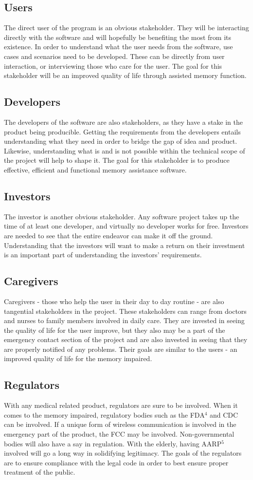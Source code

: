 \documentclass[12pt]{article}
\theoremstyle{plain}
\theoremstyle{definition}
\begin{document}
\subsection*{Users}
The direct user of the program is an obvious stakeholder.  They will be interacting directly with the software and will hopefully be benefiting the most from its existence. In order to understand what the user needs from the software, use cases and scenarios need to be developed.  These can be directly from user interaction, or interviewing those who care for the user. The goal for this stakeholder will be an improved quality of life through assisted memory function.
\subsection*{Developers}
The developers of the software are also stakeholders, as they have a stake in the product being producible. Getting the requirements from the developers entails understanding what they need in order to bridge the gap of idea and product.  Likewise, understanding what is and is not possible within the technical scope of the project will help to shape it.  The goal for this stakeholder is to produce effective, efficient and functional memory assistance software.
\subsection*{Investors}
The investor is another obvious stakeholder. Any software project takes up the time of at least one developer, and virtually no developer works for free. Investors are needed to see that the entire endeavor can make it off the ground.  Understanding that the investors will want to make a return on their investment is an important part of understanding the investors' requirements.
\subsection*{Caregivers}
Caregivers - those who help the user in their day to day routine - are also tangential stakeholders in the project.  These stakeholders can range from doctors and nurses to family members involved in daily care. They are invested in seeing the quality of life for the user improve, but they also may be a part of the emergency contact section of the project and are also invested in seeing that they are properly notified of any problems.  Their goals are similar to the users - an improved quality of life for the memory impaired.
\subsection*{Regulators}
With any medical related product, regulators are sure to be involved.  When it comes to the memory impaired, regulatory bodies such as the FDA${^4}$ and CDC can be involved.  If a unique form of wireless communication is involved in the emergency part of the product, the FCC may be involved.  Non-governmental bodies will also have a say in regulation.  With the elderly, having AARP${^5}$ involved will go a long way in solidifying legitimacy. The goals of the regulators are to ensure compliance with the legal code in order to best ensure proper treatment of the public.
\end{document}
